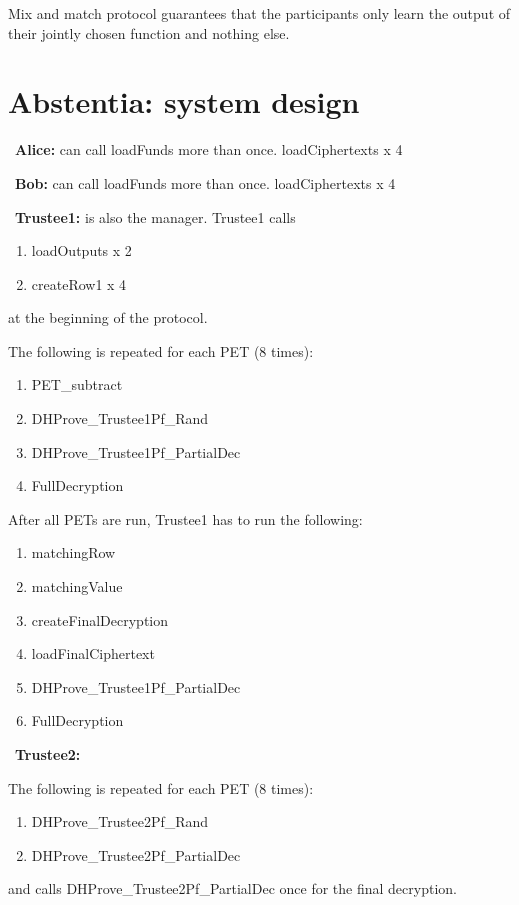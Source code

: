 Mix and match protocol guarantees that the participants only learn the output of their jointly chosen function and nothing else.






\section{Abstentia: system design}
\label{sec:system}

~\textbf{Alice:} can call loadFunds more than once. loadCiphertexts  x 4

~\textbf{Bob:} can call loadFunds more than once. loadCiphertexts x 4

~\textbf{Trustee1:} is also the manager. Trustee1 calls  
\begin{enumerate}
	\item loadOutputs  x 2
	\item  createRow1  x 4
\end{enumerate}
at the beginning of the protocol. 
\newline

The following is repeated for each PET (8 times): 
\begin{enumerate}
	\item PET\_subtract
	\item DHProve\_Trustee1Pf\_Rand
	\item DHProve\_Trustee1Pf\_PartialDec
	 \item FullDecryption
\end{enumerate}

After all PETs are run, Trustee1 has to run the following:
\begin{enumerate}
	\item matchingRow
	\item matchingValue
	\item createFinalDecryption
	\item loadFinalCiphertext
	\item DHProve\_Trustee1Pf\_PartialDec
	\item FullDecryption
\end{enumerate}

~\textbf{Trustee2:} 

The following is repeated for each PET (8 times): 
\begin{enumerate}
	\item DHProve\_Trustee2Pf\_Rand 
	\item DHProve\_Trustee2Pf\_PartialDec
\end{enumerate}
and calls DHProve\_Trustee2Pf\_PartialDec once for the final decryption.


